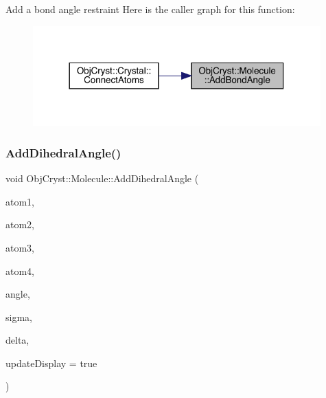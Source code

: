 Add a bond angle restraint Here is the caller graph for this function\+:
\nopagebreak
\begin{figure}[H]
\begin{center}
\leavevmode
\includegraphics[width=314pt]{class_obj_cryst_1_1_molecule_a25132c259da4d0bd739ff0ffc008575e_icgraph}
\end{center}
\end{figure}
\mbox{\label{class_obj_cryst_1_1_molecule_aae30adce9fdd16e42cab4f8e434f01cf}} 
\subsubsection{\texorpdfstring{AddDihedralAngle()}{AddDihedralAngle()}}
{\footnotesize\ttfamily void Obj\+Cryst\+::\+Molecule\+::\+Add\+Dihedral\+Angle (\begin{DoxyParamCaption}\item[{\mbox{\hyperlink{class_obj_cryst_1_1_mol_atom}{Mol\+Atom}} \&}]{atom1,  }\item[{\mbox{\hyperlink{class_obj_cryst_1_1_mol_atom}{Mol\+Atom}} \&}]{atom2,  }\item[{\mbox{\hyperlink{class_obj_cryst_1_1_mol_atom}{Mol\+Atom}} \&}]{atom3,  }\item[{\mbox{\hyperlink{class_obj_cryst_1_1_mol_atom}{Mol\+Atom}} \&}]{atom4,  }\item[{const R\+E\+AL}]{angle,  }\item[{const R\+E\+AL}]{sigma,  }\item[{const R\+E\+AL}]{delta,  }\item[{const bool}]{update\+Display = {\ttfamily true} }\end{DoxyParamCaption})}

